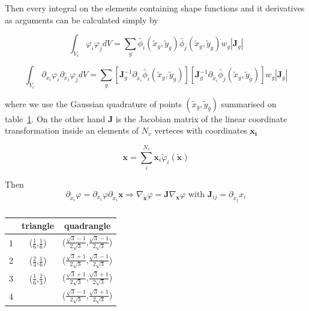 \documentclass[review]{elsarticle}
\begin{document}
Then every integral on the elements containing shape functions and it derivatives as arguments
can be calculated simply by

\begin{equation}
\int_{V_{e}} \varphi_i \varphi_j dV = \sum_{g}
\tilde{\phi_i}(\tilde{x}_g,\tilde{y}_g) 
\tilde{\phi_j}(\tilde{x}_g,\tilde{y}_g) 
w_g |\bm{J}_g|
\end{equation}

\begin{equation}
\int_{V_{e}} \partial_{x_i}\varphi_i \partial_{x_j}\varphi_j dV = \sum_{g}
\left[
\bm{J}_g^{-1}\partial_{\tilde{x}_i}\tilde{\phi_i}(\tilde{x}_g,\tilde{y}_g)
\right]
\left[
\bm{J}_g^{-1}\partial_{\tilde{x}_i}\tilde{\phi_j}(\tilde{x}_g,\tilde{y}_g) 
\right]
w_g |\bm{J}_g|
\end{equation}

where we use the Gaussian quadrature of points $(\tilde{x}_g,\tilde{y}_g)$
summarised on table~\ref{tab:gauss}. On the other hand $\bm{J}$ is the
Jacobian matrix of the linear coordinate transformation inside an elements of
$N_v$ verteces with coordinates $\bm{x_i}$

\begin{equation}
\bm{x} =
\sum_{i}^{N_{v}} \bm{x}_i \tilde{\varphi}_i (\tilde{\bm{x}})
\end{equation}

Then
\begin{equation}
\partial_{\tilde{x}_i} \varphi =
\partial_{x_i} \varphi
\partial_{\tilde{x}_i} \bm{x} 
\Rightarrow 
\nabla_{\tilde{\bm{x}}} \varphi =
\bm{J}
\nabla_{\bm{x}} \varphi \text{ with }
\bm{J}_{ij} = 
\partial_{\tilde{x}_j} x_i 
\end{equation}



\begin{table}[ht]
\centering
\begin{tabular}{ | c | c | c | }
\hline
& triangle & quadrangle \\ 
\hline
1 &($\frac{1}{6}$,$\frac{1}{6}$)& ($\frac{\sqrt{3}-1}{2\sqrt{3}}$,$\frac{\sqrt{3}-1}{2\sqrt{3}}$)\\
2 &($\frac{2}{3}$,$\frac{1}{6}$)& ($\frac{\sqrt{3}+1}{2\sqrt{3}}$,$\frac{\sqrt{3}-1}{2\sqrt{3}}$)\\
3 &($\frac{1}{6}$,$\frac{2}{3}$)& ($\frac{\sqrt{3}+1}{2\sqrt{3}}$,$\frac{\sqrt{3}+1}{2\sqrt{3}}$)\\
4 &                             & ($\frac{\sqrt{3}-1}{2\sqrt{3}}$,$\frac{\sqrt{3}+1}{2\sqrt{3}}$)\\
\hline 
\end{tabular}
\caption{\label{tab:gauss}}
\end{table}
\end{document}
